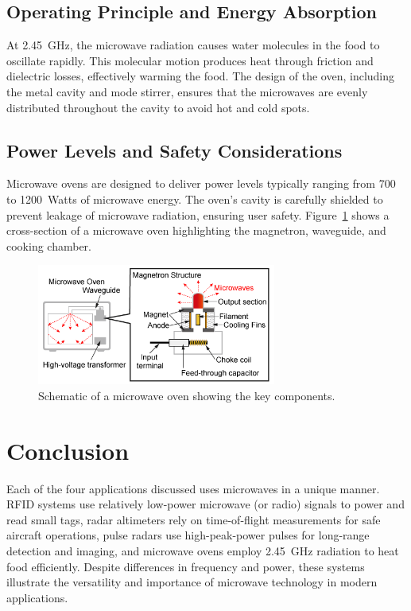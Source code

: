 \documentclass{article}
\begin{document}
\subsection*{Operating Principle and Energy Absorption}
At 2.45~GHz, the microwave radiation causes water molecules in the food to oscillate rapidly. This molecular motion produces heat through friction and dielectric losses, effectively warming the food. The design of the oven, including the metal cavity and mode stirrer, ensures that the microwaves are evenly distributed throughout the cavity to avoid hot and cold spots.

\subsection*{Power Levels and Safety Considerations}
Microwave ovens are designed to deliver power levels typically ranging from 700 to 1200~Watts of microwave energy. The oven’s cavity is carefully shielded to prevent leakage of microwave radiation, ensuring user safety. Figure~\ref{fig:microwave_oven} shows a cross-section of a microwave oven highlighting the magnetron, waveguide, and cooking chamber.

\begin{figure}[H]
    \centering
    \includegraphics[width=0.7\textwidth]{microwave_oven_schematic.png}
    \caption{Schematic of a microwave oven showing the key components.}
    \label{fig:microwave_oven}
\end{figure}

\section*{Conclusion}
Each of the four applications discussed uses microwaves in a unique manner. RFID systems use relatively low-power microwave (or radio) signals to power and read small tags, radar altimeters rely on time-of-flight measurements for safe aircraft operations, pulse radars use high-peak-power pulses for long-range detection and imaging, and microwave ovens employ 2.45~GHz radiation to heat food efficiently. Despite differences in frequency and power, these systems illustrate the versatility and importance of microwave technology in modern applications.
\end{document}

